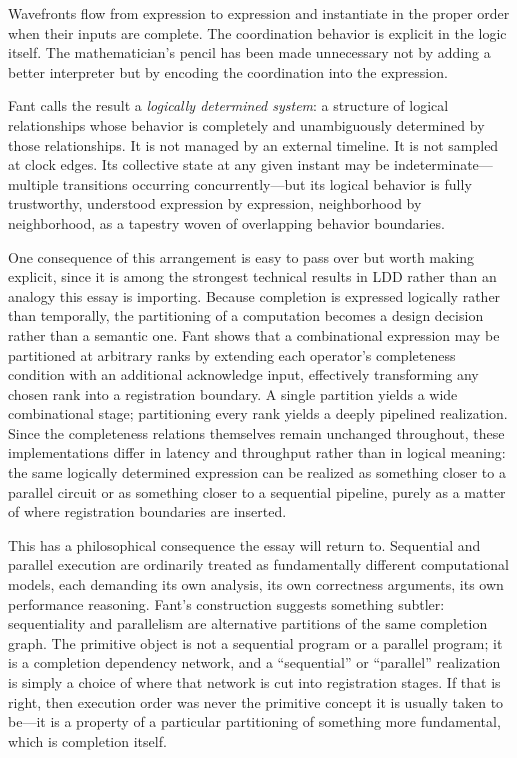 \documentclass[12pt, a4paper]{article}
\begin{document}
Wavefronts flow from expression to expression and instantiate in the
proper order when their inputs are complete. The coordination behavior
is explicit in the logic itself. The mathematician's pencil has been
made unnecessary not by adding a better interpreter but by encoding
the coordination into the expression.

Fant calls the result a \emph{logically determined system}: a structure
of logical relationships whose behavior is completely and unambiguously
determined by those relationships. It is not managed by an external
timeline. It is not sampled at clock edges. Its collective state at any
given instant may be indeterminate---multiple transitions occurring
concurrently---but its logical behavior is fully trustworthy, understood
expression by expression, neighborhood by neighborhood, as a tapestry
woven of overlapping behavior boundaries.

One consequence of this arrangement is easy to pass over but worth
making explicit, since it is among the strongest technical results
in LDD rather than an analogy this essay is importing. Because
completion is expressed logically rather than temporally, the
partitioning of a computation becomes a design decision rather than
a semantic one. Fant shows that a combinational expression may be
partitioned at arbitrary ranks by extending each operator's
completeness condition with an additional acknowledge input,
effectively transforming any chosen rank into a registration
boundary. A single partition yields a wide combinational stage;
partitioning every rank yields a deeply pipelined realization.
Since the completeness relations themselves remain unchanged
throughout, these implementations differ in latency and throughput
rather than in logical meaning: the same logically determined
expression can be realized as something closer to a parallel
circuit or as something closer to a sequential pipeline, purely as
a matter of where registration boundaries are inserted.

This has a philosophical consequence the essay will return to.
Sequential and parallel execution are ordinarily treated as
fundamentally different computational models, each demanding its
own analysis, its own correctness arguments, its own performance
reasoning. Fant's construction suggests something subtler:
sequentiality and parallelism are alternative partitions of the
same completion graph. The primitive object is not a sequential
program or a parallel program; it is a completion dependency
network, and a ``sequential'' or ``parallel'' realization is simply
a choice of where that network is cut into registration stages. If
that is right, then execution order was never the primitive
concept it is usually taken to be---it is a property of a
particular partitioning of something more fundamental, which is
completion itself.
\end{document}
